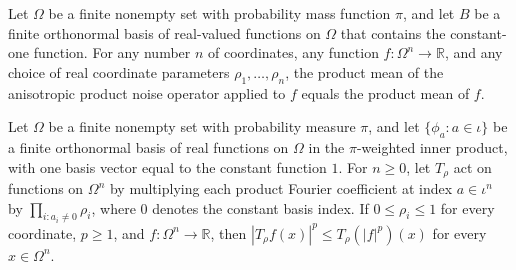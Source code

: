 \begin{theorem}
\label{FABL.FiniteFourierBasis.productMean_anisotropicProductNoiseOperator}
\leanok
{}
Let $\Omega$ be a finite nonempty set with probability mass function $\pi$, and let $B$
be a finite orthonormal basis of real-valued functions on $\Omega$ that contains the
constant-one function. For any number $n$ of coordinates, any function
$f\colon\Omega^n\to\mathbb R$, and any choice of real coordinate parameters
$\rho_1,\ldots,\rho_n$, the product mean of the anisotropic product noise operator
applied to $f$ equals the product mean of $f$.
\end{theorem}

\begin{theorem}
\label{FABL.FiniteFourierBasis.abs_anisotropicProductNoiseOperator_rpow_le}
\leanok
{}
Let $\Omega$ be a finite nonempty set with probability measure $\pi$, and let
$\{\phi_a:a\in\iota\}$ be a finite orthonormal basis of real functions on $\Omega$ in
the $\pi$-weighted inner product, with one basis vector equal to the constant function
$1$. For $n\ge 0$, let $T_\rho$ act on functions on $\Omega^n$ by multiplying each
product Fourier coefficient at index $a\in\iota^n$ by $\prod_{i:a_i\ne 0}\rho_i$, where
$0$ denotes the constant basis index. If $0\le \rho_i\le 1$ for every coordinate, $p\ge
1$, and $f:\Omega^n\to\mathbb R$, then $|T_\rho f(x)|^p\le T_\rho(|f|^p)(x)$ for every
$x\in\Omega^n$.
\end{theorem}


